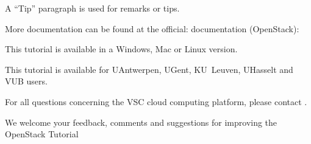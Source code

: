 \begin{tip}
A ``Tip'' paragraph is used for remarks or tips.
\end{tip}

More documentation can be found at the official: documentation (OpenStack):

This tutorial is available in a Windows, Mac or Linux version.

This tutorial is available for UAntwerpen, UGent, KU~Leuven, UHasselt and VUB users.



For all questions concerning the VSC cloud computing platform, please contact \cloudinfo.

We welcome your feedback, comments and suggestions for improving the OpenStack Tutorial

